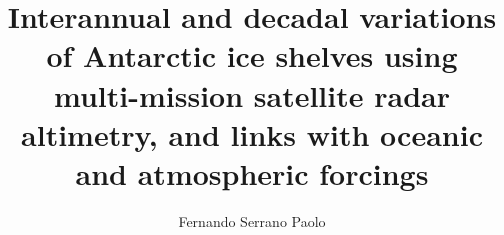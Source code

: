 %
%
%



\title{
Interannual and decadal variations of Antarctic ice shelves using
multi-mission satellite radar altimetry, and links with oceanic and atmospheric
forcings
}

\author{Fernando Serrano Paolo}



%



